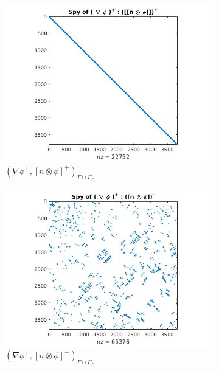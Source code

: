 \documentclass[a4paper]{book}
\begin{document}
\begin{figure}[H]
\begin{subfigure}{.5\textwidth}
\centering
  \includegraphics[width=\linewidth]{figure31.jpg}
  \caption{$( \nabla \phi^+ ,[n \otimes \phi]^+)_{\Gamma \cup \Gamma_D}$}
  \label{fig:figure31}
\end{subfigure}
\begin{subfigure}{.5\textwidth}	
\centering
  \includegraphics[width=\linewidth]{figure32.jpg}
  \caption{$( \nabla \phi^+ ,[n \otimes \phi]^-)_{\Gamma \cup \Gamma_D}$}
  \label{fig:figure32}
\end{subfigure}
\begin{subfigure}{.5\textwidth}
\centering

\end{subfigure}
\end{figure}
\end{document}
